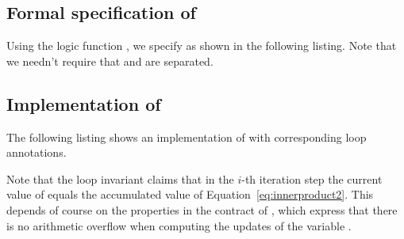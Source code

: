 

\subsection{Formal specification of \innerproduct}

Using the logic function , we specify \innerproduct as shown 
in the following listing.
Note that we needn't require that  and  are separated.



\clearpage

\subsection{Implementation of \innerproduct}

The following listing shows an implementation of \innerproduct
with corresponding loop annotations.



Note that the loop invariant  claims
that in the $i$-th iteration step the current value of 
equals the accumulated value of Equation~\eqref{eq:innerproduct2}.
This depends of course on the properties  in the contract
of , which express that there is no arithmetic overflow
when computing the updates of the variable .

\clearpage

